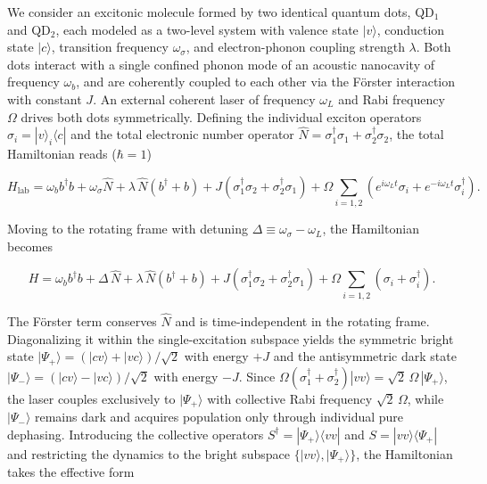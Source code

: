 \documentclass{ws-ijmpb}
\begin{document}
We consider an excitonic molecule formed by two identical quantum dots, QD$_1$ and QD$_2$,
each modeled as a two-level system with valence state $|v\rangle$, conduction state $|c\rangle$,
transition frequency $\omega_\sigma$, and electron-phonon coupling strength $\lambda$. Both dots
interact with a single confined phonon mode of an acoustic nanocavity of frequency $\omega_b$,
and are coherently coupled to each other via the F\"orster interaction with constant $J$. An
external coherent laser of frequency $\omega_L$ and Rabi frequency $\Omega$ drives both dots
symmetrically. Defining the individual exciton operators $\sigma_i = |v\rangle_i\langle c|$ and
the total electronic number operator $\hat{N} = \sigma_1^\dagger\sigma_1 +
\sigma_2^\dagger\sigma_2$, the total Hamiltonian reads ($\hbar = 1$)

\begin{equation}
	H_\mathrm{lab} = \omega_b b^\dagger b + \omega_\sigma \hat{N} + \lambda\,\hat{N}(b^\dagger + b)
	+ J\!\left(\sigma_1^\dagger\sigma_2 + \sigma_2^\dagger\sigma_1\right)
	+ \Omega\sum_{i=1,2}\!\left(e^{i\omega_L t}\sigma_i
	+ e^{-i\omega_L t}\sigma_i^\dagger\right).
	\label{eq:Hlab}
\end{equation}

Moving to the rotating frame with detuning $\Delta \equiv \omega_\sigma - \omega_L$, the
Hamiltonian becomes

\begin{equation}
	H = \omega_b b^\dagger b + \Delta\,\hat{N} + \lambda\,\hat{N}(b^\dagger + b)
	+ J\!\left(\sigma_1^\dagger\sigma_2 + \sigma_2^\dagger\sigma_1\right)
	+ \Omega\sum_{i=1,2}\!\left(\sigma_i + \sigma_i^\dagger\right).
	\label{eq:H}
\end{equation}

The F\"orster term conserves $\hat{N}$ and is time-independent in the rotating frame.
Diagonalizing it within the single-excitation subspace yields the symmetric bright state
$|\Psi_+\rangle = (|cv\rangle + |vc\rangle)/\sqrt{2}$ with energy $+J$ and the antisymmetric
dark state $|\Psi_-\rangle = (|cv\rangle - |vc\rangle)/\sqrt{2}$ with energy $-J$. Since
$\Omega(\sigma_1^\dagger + \sigma_2^\dagger)|vv\rangle = \sqrt{2}\,\Omega\,|\Psi_+\rangle$,
the laser couples exclusively to $|\Psi_+\rangle$ with collective Rabi frequency
$\sqrt{2}\,\Omega$, while $|\Psi_-\rangle$ remains dark and acquires population only through
individual pure dephasing. Introducing the collective operators $S^\dagger =
|\Psi_+\rangle\langle vv|$ and $S = |vv\rangle\langle\Psi_+|$ and restricting the dynamics to
the bright subspace $\{|vv\rangle, |\Psi_+\rangle\}$, the Hamiltonian takes the effective form
\end{document}
